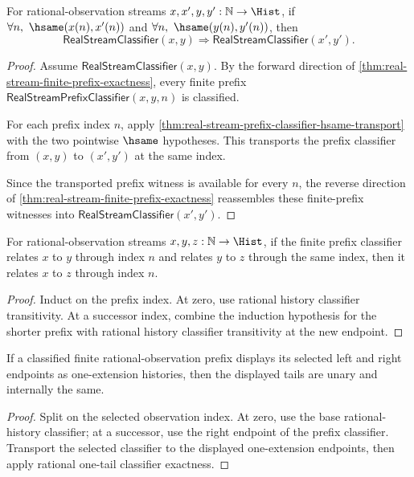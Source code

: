 \begin{theorem}
\label{thm:real-stream-classifier-hsame-transport}
For rational-observation streams $x,x',y,y':\mathbb{N}\to\Hist$, if
$\forall n,\ \hsame(x(n),x'(n))$ and
$\forall n,\ \hsame(y(n),y'(n))$, then
$$
\mathsf{RealStreamClassifier}(x,y)
\Longrightarrow
\mathsf{RealStreamClassifier}(x',y').
$$
\end{theorem}
\begin{proof}
Assume $\mathsf{RealStreamClassifier}(x,y)$. By the forward direction of
\autoref{thm:real-stream-finite-prefix-exactness}, every finite prefix
$\mathsf{RealStreamPrefixClassifier}(x,y,n)$ is classified.

For each prefix index $n$, apply
\autoref{thm:real-stream-prefix-classifier-hsame-transport} with the two
pointwise $\hsame$ hypotheses. This transports the prefix classifier from
$(x,y)$ to $(x',y')$ at the same index.

Since the transported prefix witness is available for every $n$, the reverse
direction of \autoref{thm:real-stream-finite-prefix-exactness} reassembles
these finite-prefix witnesses into
$\mathsf{RealStreamClassifier}(x',y')$.
\end{proof}

\begin{theorem}
\label{thm:real-stream-prefix-classifier-trans}
For rational-observation streams $x,y,z:\mathbb{N}\to\Hist$, if the finite
prefix classifier relates $x$ to $y$ through index $n$ and relates $y$
to $z$ through the same index, then it relates $x$ to $z$ through
index $n$.
\end{theorem}
\begin{proof}
Induct on the prefix index. At zero, use rational history classifier
transitivity. At a successor index, combine the induction hypothesis for the
shorter prefix with rational history classifier transitivity at the new
endpoint.
\end{proof}

\begin{theorem}
\label{thm:real-stream-prefix-e1-pair-readback}
If a classified finite rational-observation prefix displays its selected left and right endpoints as one-extension histories, then the displayed tails are unary and internally the same.
\end{theorem}
\begin{proof}
Split on the selected observation index. At zero, use the base rational-history classifier; at a successor, use the right endpoint of the prefix classifier. Transport the selected classifier to the displayed one-extension endpoints, then apply rational one-tail classifier exactness.
\end{proof}

